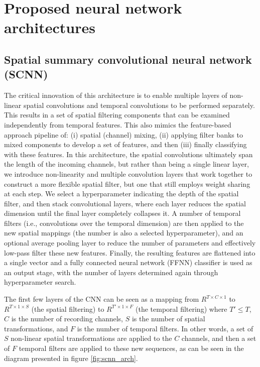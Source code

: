 \documentclass[fleqn,10pt]{wlscirep}
\begin{document}


\section*{Proposed neural network architectures}

\subsection*{Spatial summary convolutional neural network (SCNN)} \label{sec:scnn}

The critical innovation of this architecture is to enable multiple layers of non-linear spatial convolutions and temporal convolutions to be performed separately. This results in a set of spatial filtering components that can be examined independently from temporal features. This also mimics the feature-based approach pipeline of: (i) spatial (channel) mixing, (ii) applying filter banks to mixed components to develop a set of features, and then (iii) finally classifying with these features. In this architecture, the spatial convolutions ultimately span the length of the incoming channels, but rather than being a single linear layer, we introduce non-linearity and multiple convolution layers that work together to construct a more flexible spatial filter, but one that still employs weight sharing at each step. We select a hyperparameter indicating the depth of the spatial filter, and then stack convolutional layers, where each layer reduces the spatial dimension until the final layer completely collapses it. A number of temporal filters (i.e., convolutions over the temporal dimension) are then applied to the new spatial mappings (the number is also a selected hyperparameter), and an optional average pooling layer to reduce the number of parameters and effectively low-pass filter these new features. Finally, the resulting features are flattened into a single vector and a fully connected neural network (FFNN) classifier is used as an output stage, with the number of layers determined again through hyperparameter search.

The first few layers of the CNN can be seen as a mapping from $R^{T \times C \times 1}$ to $R^{T \times 1 \times S}$ (the spatial filtering) to $R^{T' \times 1 \times F }$ (the temporal filtering) where $T' \leq T$, $C$ is the number of recording channels, $S$ is the number of spatial transformations, and $F$ is the number of temporal filters. In other words, a set of $S$ non-linear spatial transformations are applied to the $C$ channels, and then a set of $F$ temporal filters are applied to these new sequences, as can be seen in the diagram presented in figure \ref{fig:scnn_arch}.
\end{document}
